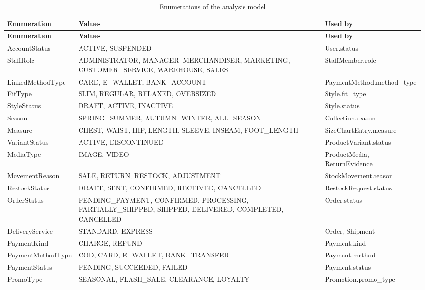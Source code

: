 {\small
\begin{xltabular}{\textwidth}{@{}L{3.2cm} Y L{3.4cm}@{}}
\caption{Enumerations of the analysis model}\label{tab:enums}\\
\toprule
\textbf{Enumeration} & \textbf{Values} & \textbf{Used by} \\ \midrule
\endfirsthead
\toprule
\textbf{Enumeration} & \textbf{Values} & \textbf{Used by} \\ \midrule
\endhead
\bottomrule
\endlastfoot
AccountStatus & ACTIVE, SUSPENDED & User.\allowbreak status \\
StaffRole & ADMINISTRATOR, MANAGER, MERCHANDISER, MARKETING, CUSTOMER\_SERVICE, WAREHOUSE, SALES & StaffMember.\allowbreak role \\
LinkedMethodType & CARD, E\_WALLET, BANK\_ACCOUNT & PaymentMethod.\allowbreak method\_type \\
FitType & SLIM, REGULAR, RELAXED, OVERSIZED & Style.\allowbreak fit\_type \\
StyleStatus & DRAFT, ACTIVE, INACTIVE & Style.\allowbreak status \\
Season & SPRING\_SUMMER, AUTUMN\_WINTER, ALL\_SEASON & Collection.\allowbreak season \\
Measure & CHEST, WAIST, HIP, LENGTH, SLEEVE, INSEAM, FOOT\_LENGTH & SizeChartEntry.\allowbreak measure \\
VariantStatus & ACTIVE, DISCONTINUED & ProductVariant.\allowbreak status \\
MediaType & IMAGE, VIDEO & ProductMedia, ReturnEvidence \\
MovementReason & SALE, RETURN, RESTOCK, ADJUSTMENT & StockMovement.\allowbreak reason \\
RestockStatus & DRAFT, SENT, CONFIRMED, RECEIVED, CANCELLED & RestockRequest.\allowbreak status \\
OrderStatus & PENDING\_PAYMENT, CONFIRMED, PROCESSING, PARTIALLY\_SHIPPED, SHIPPED, DELIVERED, COMPLETED, CANCELLED & Order.\allowbreak status \\
DeliveryService & STANDARD, EXPRESS & Order, Shipment \\
PaymentKind & CHARGE, REFUND & Payment.\allowbreak kind \\
PaymentMethodType & COD, CARD, E\_WALLET, BANK\_TRANSFER & Payment.\allowbreak method \\
PaymentStatus & PENDING, SUCCEEDED, FAILED & Payment.\allowbreak status \\
PromoType & SEASONAL, FLASH\_SALE, CLEARANCE, LOYALTY & Promotion.\allowbreak promo\_type \\

\end{xltabular}}
